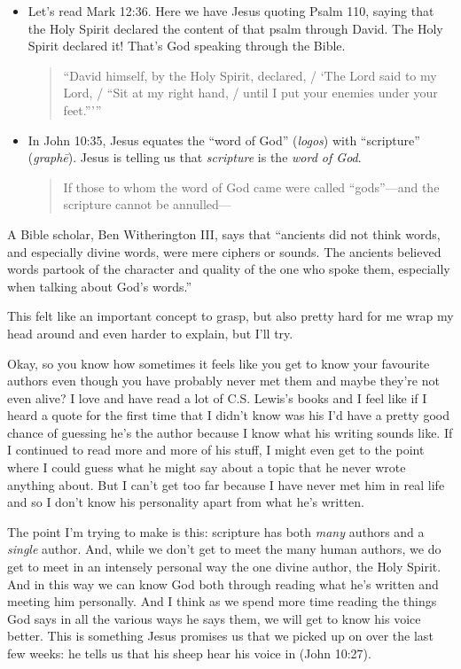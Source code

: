 \begin{itemize}
    \item Let's read Mark 12:36. Here we have Jesus quoting Psalm 110, saying
        that the Holy Spirit declared the content of that psalm through David.
        The Holy Spirit declared it! That's God speaking through the Bible.

        \begin{quote}
            \enquote{David himself, by the Holy Spirit, declared, / \enquote{The
            Lord said to my Lord, / \enquote{Sit at my right hand, / until I put
            your enemies under your feet.}}}
        \end{quote}
    \item In John 10:35, Jesus equates the \enquote{word of God}
        (\textit{logos}) with \enquote{scripture} (\textit{graph\={e}}). Jesus
        is telling us that \textit{scripture} is the \textit{word of God}.

        \begin{quote}
            If those to whom the word of God came were called
            \enquote{gods}---and the scripture cannot be annulled---
        \end{quote}
\end{itemize}

A Bible scholar, Ben Witherington III, says that \enquote{ancients did not think
words, and especially divine words, were mere ciphers or sounds. The ancients
believed words partook of the character and quality of the one who spoke them,
especially when talking about God's words.}

This felt like an important concept to grasp, but also pretty hard for me wrap
my head around and even harder to explain, but I'll try.

Okay, so you know how sometimes it feels like you get to know your favourite
authors even though you have probably never met them and maybe they're not even
alive? I love and have read a lot of C.S. Lewis's books and I feel like if I
heard a quote for the first time that I didn't know was his I'd have a pretty
good chance of guessing he's the author because I know what his writing sounds
like. If I continued to read more and more of his stuff, I might even get to the
point where I could guess what he might say about a topic that he never wrote
anything about. But I can't get too far because I have never met him in real
life and so I don't know his personality apart from what he's written.

The point I'm trying to make is this: scripture has both \textit{many} authors
and a \textit{single} author. And, while we don't get to meet the many human
authors, we do get to meet in an intensely personal way the one divine author,
the Holy Spirit. And in this way we can know God both through reading what he's
written and meeting him personally. And I think as we spend more time reading
the things God says in all the various ways he says them, we will get to know
his voice better. This is something Jesus promises us that we picked up on over
the last few weeks: he tells us that his sheep hear his voice in (John 10:27).

